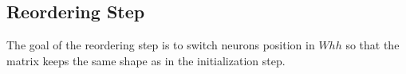 \subsection{Reordering Step}
    The goal of the reordering step is to switch neurons position in $Whh$ so that the matrix keeps the same shape as in the initialization step. 









